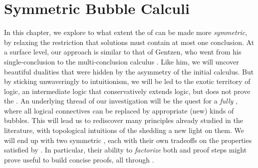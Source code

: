 \setchapterpreamble[u]{\margintoc}
\chapter{Symmetric Bubble Calculi}

In this chapter, we explore to what extent the  of
 can be made more \emph{symmetric}, by relaxing the restriction
that solutions must contain at most one conclusion. At a surface level, our
approach is similar to that of Gentzen, who went from his single-conclusion
  to the multi-conclusion calculus . Like
him, we will uncover beautiful dualities that were hidden by the asymmetry of
the initial calculus. But by sticking unwaveringly to intuitionism, we will be
led to the exotic territory of  logic, an intermediate
logic that conservatively extends  logic, but does not prove the
. An underlying thread of our investigation will be the
quest for a \emph{fully } , where all logical connectives
can be replaced by appropriate (new) kinds of bubbles. This will lead us to
rediscover many principles already studied in the 
literature, with topological intuitions of the   shedding a new
light on them. We will end up with two symmetric , each with their
own tradeoffs on the properties satisfied by . In particular,
their ability to \emph{factorize} both  and  proof steps might
prove useful to build concise proofs, all through .


